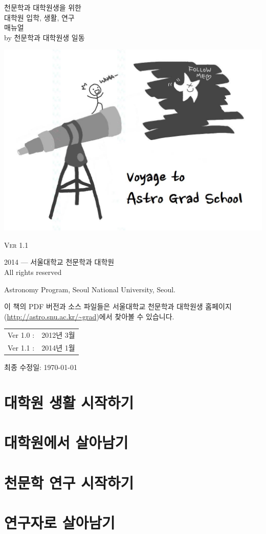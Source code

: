 \documentclass[11pt,a4paper,oneside]{memoir}
\newcommand*{\FSfont}[1]{%
  \fontencoding{T1}\fontfamily{#1}\selectfont}
\newlength{\drop}
\newcommand*{\titlePP}{\begingroup%
\drop=0.06\textheight
\vspace*{\drop}
\begin{raggedleft}
{\HUGE\color{MidnightBlue} 천문학과 대학원생을 위한}\\[\baselineskip]
{{\LARGE{대학원 입학, 생활, 연구}}}\\[1.1\baselineskip]
{\HUGE\color{MidnightBlue} 매뉴얼} \\[\baselineskip]
{\Large by 천문학과 대학원생 일동}\par
\end{raggedleft}
\vfill
\begin{center}
\includegraphics[width=6in]{./Figures/cover_mod.jpg}
\end{center}
\vfill
\begin{center}
{\large \textsc{Ver 1.1}}
\end{center}
\vspace*{\drop}
\endgroup}
\begin{document}
\begin{frontmatter}
\OnehalfSpacing
\pagestyle{empty}
\titlePP

\clearpage
\begingroup
\footnotesize
\setlength{\parindent}{0pt}
\setlength{\parskip}{\baselineskip}
\textcopyright{} 2014 --- 서울대학교 천문학과 대학원 \\
All rights reserved

Astronomy Program, Seoul National University, Seoul.

이 책의 PDF 버전과 소스 파일들은 서울대학교 천문학과 대학원생
홈페이지(\url{http://astro.snu.ac.kr/~grad})에서 찾아볼 수 있습니다.

\begin{center}
\begin{tabular}{ll}
  Ver 1.0 : \hspace{2cm}   & 2012년 3월 \\
  Ver 1.1 : \hspace{2cm}   & 2014년 1월 \\
\end{tabular}
\end{center}
최종 수정일: \today

\endgroup
\clearpage

\tableofcontents
\clearpage



\end{frontmatter}
\clearpage

\begin{mainmatter}
\OnehalfSpacing
\chapter{대학원 생활 시작하기}


\chapter{대학원에서 살아남기}


\chapter{천문학 연구 시작하기}


\chapter{연구자로 살아남기}


\end{mainmatter}
\end{document}
